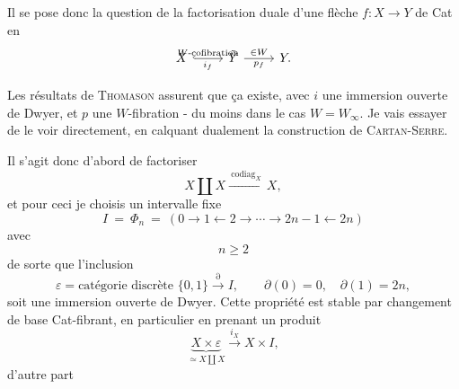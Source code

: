 \documentclass[11pt]{article}
\newcommand{\printedpage}[1]{\marginpar{\footnotesize p.~#1}}
\newcommand{\msp}[1]{\marginpar{\footnotesize [#1]}}
\begin{document}
\printedpage{145}

\msp{page 228}
Il se pose donc la question de la factorisation duale d'une flèche $f : X \longrightarrow Y$ de Cat en
\[
\begin{tikzcd}
X \arrow[r, hook, "W\text{-cofibration}", "i_f"'] & \tilde{Y} \arrow[r, "\in W", "p_f"'] & Y.
\end{tikzcd}
\]

Les résultats de \textsc{Thomason} assurent que ça existe, avec $i$ une immersion ouverte de Dwyer, et $p$ une $W$-fibration - du moins dans le cas $W = W_\infty$. Je vais essayer de le voir directement, en calquant dualement la construction de \textsc{Cartan-Serre}.

Il s'agit donc d'abord de factoriser
\[
X \amalg X \xrightarrow{\ \mathrm{codiag}_X\ } X,
\]
et pour ceci je choisis un intervalle fixe
\[
I \ = \ \Phi_n \ = \ (0 \longrightarrow 1 \longleftarrow 2 \longrightarrow \cdots \longrightarrow 2n-1 \longleftarrow 2n)
\]
avec
\[
n \geq 2
\]
de sorte que l'inclusion
\[
\varepsilon = \text{catégorie discrète } \{0,1\} \xrightarrow{\partial} I, \qquad \partial(0) = 0, \quad \partial(1) = 2n,
\]
soit une immersion ouverte de Dwyer. Cette propriété est stable par changement de base Cat-fibrant, en particulier en prenant un produit
\[
\underbrace{X \times \varepsilon}_{\simeq X \coprod X} \xrightarrow{i_X} X \times I,
\]
\begingroup\renewcommand{\thefootnote}{}\endgroup
\printedpage{146}
\msp{page 229}
d'autre part
\end{document}
